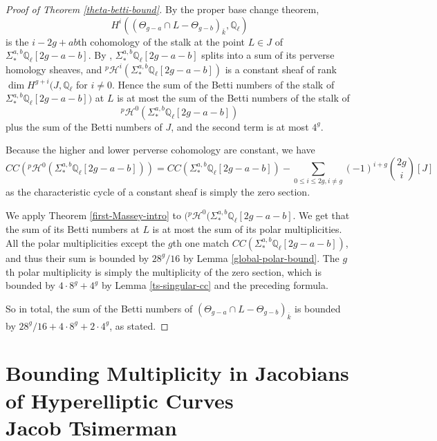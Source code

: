 \begin{proof}[Proof of Theorem \ref{theta-betti-bound}]  By the proper base change theorem, \[ H^i (  (\Theta_{g-a} \cap L - \Theta_{g-b} )_{\overline{k}}, \mathbb Q_\ell)\] is the $i-2g+ab$th cohomology of the stalk at the point $L \in J$ of $ \Sigma^{a,b}_* \mathbb Q_\ell[2g-a-b]$. By \citep[Lemma 3.1 and Lemma 3.6]{TS}, $\Sigma^{a,b}_* \mathbb Q_\ell[2g-a-b] $ splits into a sum of its perverse homology sheaves, and ${}^p \mathcal H^i ( \Sigma^{a,b}_* \mathbb Q_\ell[2g-a-b] )$ is a constant sheaf of rank $\dim H^{g+i} (J,\mathbb Q_\ell$ for $i \neq 0$. Hence the sum of the Betti numbers of the stalk of  $ \Sigma^{a,b}_* \mathbb Q_\ell[2g-a-b] )$
at $L$ is at most the sum of the Betti numbers of the stalk of \[ {}^p \mathcal H^0 ( \Sigma^{a,b}_* \mathbb Q_\ell[2g-a-b] )\] plus the sum of the Betti numbers of $J$, and the second term is at most $4^g$.

Because the higher and lower perverse cohomology are constant, we have \[ CC \left( {}^p \mathcal H^0 ( \Sigma^{a,b}_* \mathbb Q_\ell[2g-a-b] )\right) = CC \left( \Sigma^{a,b}_* \mathbb Q_\ell[2g-a-b]  \right) - \sum_{0 \leq i \leq 2g, i\neq g} (-1)^{i+g } {2g \choose i} [ J] \] as the characteristic cycle of a constant sheaf is simply the zero section.

We apply Theorem \ref{first-Massey-intro} to $( {}^p \mathcal H^0 ( \Sigma^{a,b}_* \mathbb Q_\ell[2g-a-b] $. We get that the sum of its Betti numbers at $L$ is at most the sum of its polar multiplicities. All the polar multiplicities except the $g$th one match $CC \left( \Sigma^{a,b}_* \mathbb Q_\ell[2g-a-b]  \right) $, and thus their sum is bounded by $28^g/16$ by Lemma \ref{global-polar-bound}. The $g$th polar multiplicity is simply the multiplicity of the zero section, which is bounded by $4 \cdot 8^g + 4^g $ by Lemma \ref{ts-singular-cc} and the preceding formula.

So in total, the sum of the Betti numbers of $(\Theta_{g-a} \cap L - \Theta_{g-b} )_{\overline{k}}$ is bounded by $28^g/16 + 4 \cdot 8^g + 2\cdot 4^g$, as stated.

 \end{proof}


\appendix

\section[Bounding Multiplicity in Jacobians of Hyperelliptic curves]{ Bounding Multiplicity in Jacobians of Hyperelliptic Curves\\  Jacob Tsimerman}


